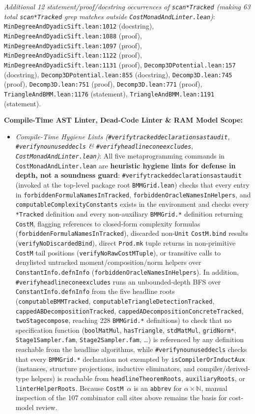 \documentclass[10pt,letterpaper]{article}
\renewcommand{\_}{\origunderscore\allowbreak}
\newcommand{\code}[1]{\texttt{#1}}
\begin{document}
\emph{Additional 12 statement/proof/docstring occurrences of \code{scan*Tracked} (making 63 total \code{scan*Tracked} grep matches outside \code{CostMonadAndLinter.lean})}: \code{MinDegreeAndDyadicSift.lean:1012} (docstring), \code{MinDegreeAndDyadicSift.lean:1088} (proof), \code{MinDegreeAndDyadicSift.lean:1097} (proof), \code{MinDegreeAndDyadicSift.lean:1122} (proof), \code{MinDegreeAndDyadicSift.lean:1131} (proof), \code{Decomp3DPotential.lean:157} (docstring), \code{Decomp3DPotential.lean:855} (docstring), \code{Decomp3D.lean:745} (proof), \code{Decomp3D.lean:751} (proof), \code{Decomp3D.lean:771} (proof), \code{TriangleAndBMM.lean:1176} (statement), \code{TriangleAndBMM.lean:1191} (statement).

\textbf{Compile-Time AST Linter, Dead-Code Linter \& RAM Model Scope:}
\begin{itemize}
  \item \emph{Compile-Time Hygiene Lints (\code{\#verify\_tracked\_declarations\_ast\_audit}, \code{\#verify\_no\_unused\_decls} \& \code{\#verify\_headline\_cone\_excludes}, \code{CostMonadAndLinter.lean})}:
  All five metaprogramming commands in \code{CostMonadAndLinter.lean} are \textbf{heuristic hygiene lints for defense in depth, not a soundness guard}: \code{\#verify\_tracked\_declarations\_ast\_audit} (invoked at the top-level package root \code{BMMGrid.lean}) checks that every entry in \code{forbiddenFormulaNamesInTracked}, \code{forbiddenOracleNamesInHelpers}, and \code{computableComplexityConstants} exists in the environment and checks every \code{*Tracked} definition and every non-auxiliary \code{BMMGrid.*} definition returning \code{CostM}, flagging references to closed-form complexity formulas (\code{forbiddenFormulaNamesInTracked}), discarded non-\code{Unit} \code{CostM.bind} results (\code{verifyNoDiscardedBind}), direct \code{Prod.mk} tuple returns in non-primitive \code{CostM} tail positions (\code{verifyNoRawCostMTuple}), or transitive calls to denylisted untracked moment/composition/norm helpers over \code{ConstantInfo.defnInfo} (\code{forbiddenOracleNamesInHelpers}). In addition, \code{\#verify\_headline\_cone\_excludes} runs an unbounded-depth BFS over \code{ConstantInfo.defnInfo} from the five headline roots (\code{computableBMMTracked}, \code{computableTriangleDetectionTracked}, \code{cappedABDecompositionTracked}, \code{cappedADecompositionConcreteTracked}, \code{twoStage\_compose}, reaching 228 \code{BMMGrid.*} definitions) to check that no specification function (\code{boolMatMul}, \code{hasTriangle}, \code{stdMatMul}, \code{gridNorm*}, \code{Stage1Sampler.fam}, \code{Stage2Sampler.fam}, \dots) is referenced by any definition reachable from the headline algorithms, while \code{\#verify\_no\_unused\_decls} checks that every \code{BMMGrid.*} declaration not exempted by \code{isCompilerOrInductAux} (instances, structure projections, inductive eliminators, and compiler/derived-type helpers) is reachable from \code{headlineTheoremRoots}, \code{auxiliaryRoots}, or \code{linterHelperRoots}. Because \code{CostM $\alpha$} is an \code{abbrev} for $\alpha \times \mathbb{N}$, manual inspection of the 107 combinator call sites above remains the basis for cost-model review.

\end{itemize}
\end{document}
